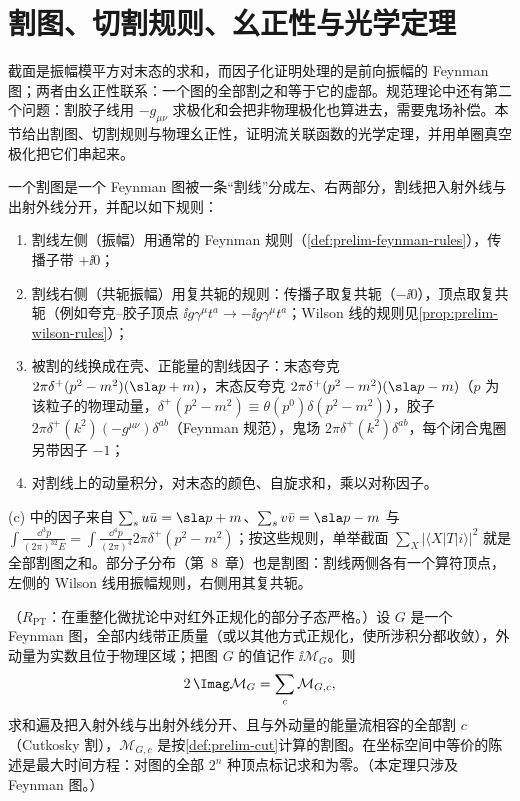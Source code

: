 \section{割图、切割规则、幺正性与光学定理}\label{sec:prelim-cuts}

截面是振幅模平方对末态的求和，而因子化证明处理的是前向振幅的 Feynman 图；两者由幺正性联系：一个图的全部割之和等于它的虚部。规范理论中还有第二个问题：割胶子线用 $-g_{\mu\nu}$ 求极化和会把非物理极化也算进去，需要鬼场补偿。本节给出割图、切割规则与物理幺正性，证明流关联函数的光学定理，并用单圈真空极化把它们串起来。

\begin{definition}[割图]\label{def:prelim-cut}
一个割图是一个 Feynman 图被一条“割线”分成左、右两部分，割线把入射外线与出射外线分开，并配以如下规则：
\begin{enumerate}[label=(\alph*),leftmargin=2.2em,itemsep=0pt,topsep=2pt]
\item 割线左侧（振幅）用通常的 Feynman 规则（\cref{def:prelim-feynman-rules}），传播子带 $+\ii0$；
\item 割线右侧（共轭振幅）用复共轭的规则：传播子取复共轭（$-\ii0$），顶点取复共轭（例如夸克--胶子顶点 $\ii g\gamma^\mu t^a\to-\ii g\gamma^\mu t^a$；Wilson 线的规则见\cref{prop:prelim-wilson-rules}）；
\item 被割的线换成在壳、正能量的割线因子：末态夸克 $2\pi\delta^+(p^2-m^2)(\sla p+m)$，末态反夸克 $2\pi\delta^+(p^2-m^2)(\sla p-m)$（$p$ 为该粒子的物理动量，$\delta^+(p^2-m^2)\equiv\theta(p^0)\delta(p^2-m^2)$），胶子 $2\pi\delta^+(k^2)(-g^{\mu\nu})\delta^{ab}$（Feynman 规范），鬼场 $2\pi\delta^+(k^2)\delta^{ab}$，每个闭合鬼圈另带因子 $-1$；
\item 对割线上的动量积分，对末态的颜色、自旋求和，乘以对称因子。
\end{enumerate}
\end{definition}

(c) 中的因子来自 $\sum_su\bar u=\sla p+m$、$\sum_sv\bar v=\sla p-m$ 与 $\int\frac{\dd^3p}{(2\pi)^32E}=\int\frac{\dd^4p}{(2\pi)^4}2\pi\delta^+(p^2-m^2)$；按这些规则，单举截面 $\sum_X|\langle X|T|i\rangle|^2$ 就是全部割图之和。部分子分布（第~8~章）也是割图：割线两侧各有一个算符顶点，左侧的 Wilson 线用振幅规则，右侧用其复共轭。

\begin{theorem}\label{thm:prelim-cutting-rules}
（$R_{\mathrm{PT}}$：在重整化微扰论中对红外正规化的部分子态严格。）设 $G$ 是一个 Feynman 图，全部内线带正质量（或以其他方式正规化，使所涉积分都收敛），外动量为实数且位于物理区域；把图 $G$ 的值记作 $\ii\mathcal M_G$。则
\begin{equation}\label{eq:prelim-cutting}
2\,\Imag\mathcal M_G=\sum_{c}\mathcal M_{G,c},
\end{equation}
求和遍及把入射外线与出射外线分开、且与外动量的能量流相容的全部割 $c$（Cutkosky 割），$\mathcal M_{G,c}$ 是按\cref{def:prelim-cut}计算的割图。在坐标空间中等价的陈述是最大时间方程：对图的全部 $2^n$ 种顶点标记求和为零。（本定理只涉及 Feynman 图。）
\end{theorem}


